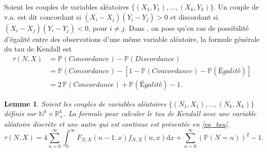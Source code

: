 \documentclass{article}
\newtheorem{lemme}{Lemme}
\begin{document}
	Soient les couples de variables aléatoires $\{(X_1,Y_1),\dots, (X_k,Y_k) \}$.
	Un couple de v.a. est dit concordant si $(X_i - X_j) (Y_i - Y_j) > 0$ et discordant si $(X_i - X_j) (Y_i - Y_j) < 0$, pour $i \neq j$.
	Dans \cite{Nikoloulopoulos_Kendall_discret}, on pose qu'en cas de possibilité d'égalité entre des observations d'une même variable aléatoire, la formule générale du tau de Kendall est
	\begin{align}
		\tau (N,X)
		&= \mathbb{P}(Concordance) - \mathbb{P}(Discordance) \nonumber \\
		&= \mathbb{P}(Concordance) - \left[1 - \mathbb{P}(Concordance) - \mathbb{P}(\textit{É}galit\text{é}) \right] \nonumber \\
		&= 2\,\mathbb{P}(Concordance) + \mathbb{P}(\textit{É}galit\text{é}) - 1. \label{eq_Definition_tau_discret}
	\end{align}
	
	\begin{lemme}\label{lemme}
		Soient les couples de variables aléatoires $\{(N_1,X_1), \dots, (N_k,X_k) \}$ définis sur $\mathbb{N}^k \times \mathbb{R}_+^k$.
		La formule pour calculer le tau de Kendall avec une variable aléatoire discrète et une autre qui est continue est présentée en \eqref{eq_tau}.
		\begin{equation}\label{eq_tau}
			\tau (N,X) = 4 \sum_{n=0}^{\infty} \int_{0}^{\infty} F_{N,X}(n-1, x) f_{N,X}(n, x) \text{d}x + \sum_{n=0}^{\infty} \left(\mathbb{P}(N=n)\right)^2 - 1.
		\end{equation}
	\end{lemme}
\end{document}
